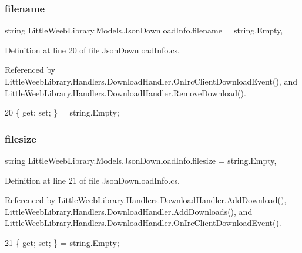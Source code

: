 \subsubsection{\texorpdfstring{filename}{filename}}
{\footnotesize\ttfamily string Little\+Weeb\+Library.\+Models.\+Json\+Download\+Info.\+filename = string.\+Empty\hspace{0.3cm}{\ttfamily [get]}, {\ttfamily [set]}}



Definition at line 20 of file Json\+Download\+Info.\+cs.



Referenced by Little\+Weeb\+Library.\+Handlers.\+Download\+Handler.\+On\+Irc\+Client\+Download\+Event(), and Little\+Weeb\+Library.\+Handlers.\+Download\+Handler.\+Remove\+Download().


\begin{DoxyCode}
20 \{ \textcolor{keyword}{get}; \textcolor{keyword}{set}; \} = \textcolor{keywordtype}{string}.Empty;
\end{DoxyCode}
\mbox{\label{class_little_weeb_library_1_1_models_1_1_json_download_info_afd063798a57238b7cfd014f60efdfff4}} 
\subsubsection{\texorpdfstring{filesize}{filesize}}
{\footnotesize\ttfamily string Little\+Weeb\+Library.\+Models.\+Json\+Download\+Info.\+filesize = string.\+Empty\hspace{0.3cm}{\ttfamily [get]}, {\ttfamily [set]}}



Definition at line 21 of file Json\+Download\+Info.\+cs.



Referenced by Little\+Weeb\+Library.\+Handlers.\+Download\+Handler.\+Add\+Download(), Little\+Weeb\+Library.\+Handlers.\+Download\+Handler.\+Add\+Downloads(), and Little\+Weeb\+Library.\+Handlers.\+Download\+Handler.\+On\+Irc\+Client\+Download\+Event().


\begin{DoxyCode}
21 \{ \textcolor{keyword}{get}; \textcolor{keyword}{set}; \} = \textcolor{keywordtype}{string}.Empty;
\end{DoxyCode}
\mbox{\label{class_little_weeb_library_1_1_models_1_1_json_download_info_a25aeccc063b602b3d6576f12a9a1b1df}} 
